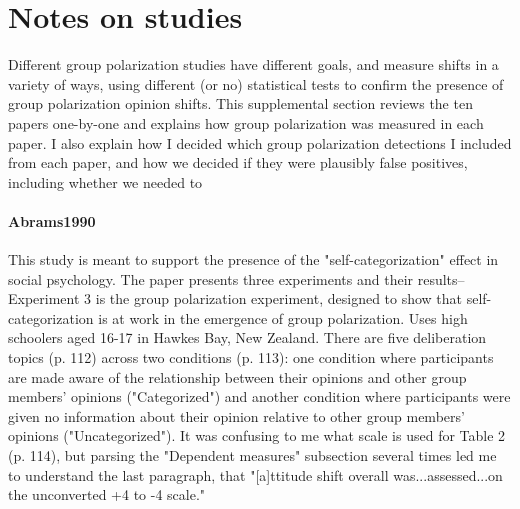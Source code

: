 \documentclass[11pt, letterpaper]{article}
\begin{document}


\setlength{\bibleftmargin}{.125in}
\setlength{\bibindent}{-\bibleftmargin}



\appendix

\section{Notes on studies}

Different group polarization studies have different goals, and measure shifts
in a variety of ways, using different (or no) statistical tests to confirm
the presence of group polarization opinion shifts. This supplemental section
reviews the ten papers one-by-one and explains how group 
polarization was measured in each paper. I also explain how I decided which
group polarization detections I included from each paper, and how we decided
if they were plausibly false positives, including whether we needed to 

\paragraph{{Abrams1990}} This study is meant to support the presence of the "self-categorization" effect in
social psychology. The paper presents three experiments and their results--Experiment 3 is the group polarization
experiment, designed to show that self-categorization is at work in the emergence of group polarization. Uses high
schoolers aged 16-17 in Hawkes Bay, New Zealand. There are five deliberation topics (p. 112) across two conditions
(p. 113): one condition where participants are made aware of the relationship between their opinions and other group
members' opinions ("Categorized") and another condition where participants were given no information about their
opinion relative to other group members' opinions ("Uncategorized"). It was confusing to me what scale is used for
Table 2 (p. 114), but parsing the "Dependent measures" subsection several times led me to understand the last
paragraph, that "[a]ttitude shift overall was...assessed...on the unconverted +4 to -4 scale."
\end{document}
